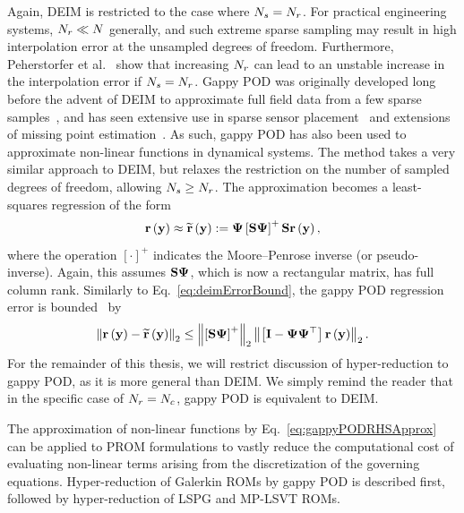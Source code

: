 Again, DEIM is restricted to the case where $N_s = N_r$. For practical engineering systems, $N_r \ll N$ generally, and such extreme sparse sampling may result in high interpolation error at the unsampled degrees of freedom. Furthermore, Peherstorfer et al.~\cite{Peherstorfer2020} show that increasing $N_r$ can lead to an unstable increase in the interpolation error if $N_s = N_r$. Gappy POD was originally developed long before the advent of DEIM to approximate full field data from a few sparse samples~\cite{Everson1995}, and has seen extensive use in sparse sensor placement~\cite{willcoxGappyPOD,ManoharSparseSensor} and extensions of missing point estimation~\cite{Zimmermann2016}. As such, gappy POD has also been used to approximate non-linear functions in dynamical systems. The method takes a very similar approach to DEIM, but relaxes the restriction on the number of sampled degrees of freedom, allowing $N_s \ge N_r$. The approximation becomes a least-squares regression of the form
%
\begin{equation}\label{eq:gappyPODRHSApprox}
    \resFunc{\dummyVec} \approx \resApproxFunc{\dummyVec} \defEq \deimBasis \left[ \sampMat \deimBasis \right]^{+} \sampMat \resFunc{\dummyVec},
\end{equation}
%
where the operation $[\cdot]^+$ indicates the Moore--Penrose inverse (or pseudo-inverse). Again, this assumes $\sampMat \deimBasis$, which is now a rectangular matrix, has full column rank. Similarly to Eq.~\ref{eq:deimErrorBound}, the gappy POD regression error is bounded~\cite{Peherstorfer2020} by
%
\begin{equation}\label{eq:gappyPODErrorBound}
    \left\Vert \resFunc{\dummyVec} - \resApproxFunc{\dummyVec} \right\Vert_2 \le \left\Vert \left[ \sampMat \deimBasis \right]^{+} \right\Vert_2 \left\Vert \left[ \identMat - \deimBasis \deimBasis^\top \right] \resFunc{\dummyVec} \right\Vert_2.
\end{equation}
%
For the remainder of this thesis, we will restrict discussion of hyper-reduction to gappy POD, as it is more general than DEIM. We simply remind the reader that in the specific case of $N_r = N_c$, gappy POD is equivalent to DEIM.

The approximation of non-linear functions by Eq.~\ref{eq:gappyPODRHSApprox} can be applied to PROM formulations to vastly reduce the computational cost of evaluating non-linear terms arising from the discretization of the governing equations. Hyper-reduction of Galerkin ROMs by gappy POD is described first, followed by hyper-reduction of LSPG and MP-LSVT ROMs.

